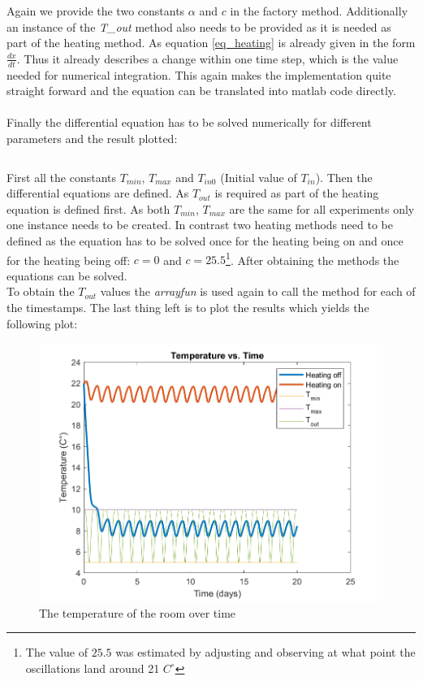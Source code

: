 \documentclass[14pt]{article}
\begin{document}
\inputminted[linenos]{octave}{./matlab/make_heating.m}

Again we provide the two constants $\alpha$ and $c$ in the factory method. Additionally an instance of the \textit{T\_out}
method also needs to be provided as it is needed as part of the heating method. As equation \ref{eq_heating} is already
given in the form $\frac{dx}{dt}$. Thus it already describes a change within one time step, which is the value
needed for numerical integration. This again makes the implementation quite straight forward and the equation can be
translated into matlab code directly.\\
\\
Finally the differential equation has to be solved numerically for different parameters and the result plotted:

\inputminted[linenos]{octave}{./matlab/assignment_3.m}

First all the constants $T_{min}$, $T_{max}$ and $T_{in 0}$ (Initial value of $T_{in}$). Then the differential
equations are defined. As $T_{out}$ is required as part of the heating equation is defined first. As both $T_{min}$, ${T_{max}}$
are the same for all experiments only one instance needs to be created. In contrast two heating methods need to be defined as the equation has to be solved
once for the heating being on and once for the heating being off: $c = 0 $ and $c = 25.5$\footnote{The value of $25.5$ was
estimated by adjusting and observing at what point the oscillations land around 21 $C^{\circ}$}. After obtaining
the methods the equations can be solved. 
\\
To obtain the $T_{out}$ values the \textit{arrayfun} is used again to call the method
for each of the timestamps. The last thing left is to plot the results which yields the following plot:

\begin{figure}[H]
  \includegraphics[width=14cm]{./output/assignment3.png}
  \caption{The temperature of the room over time}
  \label{fig:figure7}
\end{figure}

\printbibliography
\end{document}
